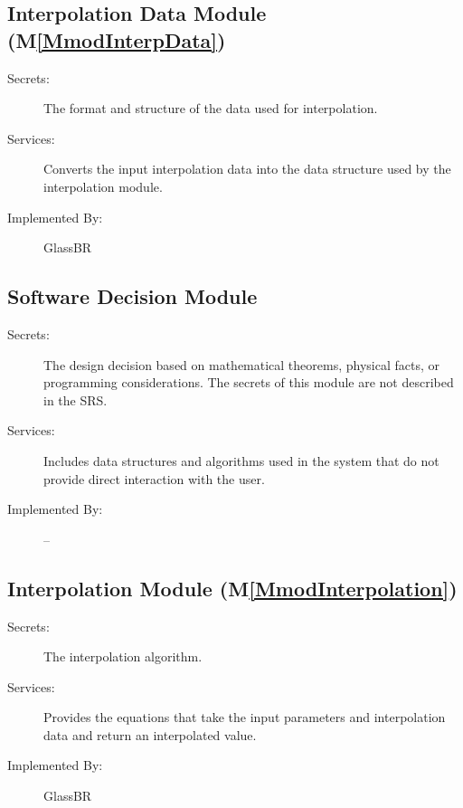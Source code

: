 \documentclass[12pt]{article}
\begin{document}
\subsection{Interpolation Data Module (M\ref{MmodInterpData})}
\label{Sec:IDM()}
\begin{description}
\item[Secrets:]The format and structure of the data used for interpolation.
\item[Services:]Converts the input interpolation data into the data structure used by the interpolation module.
\item[Implemented By:]GlassBR
\end{description}
\subsection{Software Decision Module}
\label{Sec:SDM}
\begin{description}
\item[Secrets:]The design decision based on mathematical theorems, physical facts, or programming considerations. The secrets of this module are not described in the SRS.
\item[Services:]Includes data structures and algorithms used in the system that do not provide direct interaction with the user.
\item[Implemented By:]--
\end{description}
\subsection{Interpolation Module (M\ref{MmodInterpolation})}
\label{Sec:IM()}
\begin{description}
\item[Secrets:]The interpolation algorithm.
\item[Services:]Provides the equations that take the input parameters and interpolation data and return an interpolated value.
\item[Implemented By:]GlassBR
\end{description}
\end{document}

